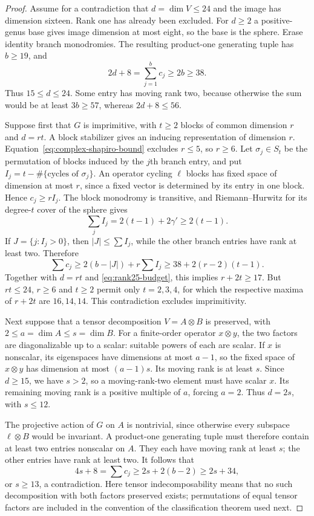 \begin{proof}
Assume for a contradiction that $d=\dim V\le24$ and the image has dimension sixteen. Rank one has already been excluded. For $d\ge2$ a positive-genus base gives image dimension at most eight, so the base is the sphere. Erase identity branch monodromies. The resulting product-one generating tuple has $b\ge19$, and
\begin{equation}\label{eq:rank25-budget}
 2d+8=\sum_{j=1}^{b}c_j\ge2b\ge38.
\end{equation}
Thus $15\le d\le24$. Some entry has moving rank two, because otherwise the sum would be at least $3b\ge57$, whereas $2d+8\le56$.

Suppose first that $G$ is imprimitive, with $t\ge2$ blocks of common dimension $r$ and $d=rt$. A block stabilizer gives an inducing representation of dimension $r$. Equation~\eqref{eq:complex-shapiro-bound} excludes $r\le5$, so $r\ge6$. Let $\sigma_j\in S_t$ be the permutation of blocks induced by the $j$th branch entry, and put $I_j=t-\#\{\text{cycles of }\sigma_j\}$. An operator cycling $\ell$ blocks has fixed space of dimension at most $r$, since a fixed vector is determined by its entry in one block. Hence $c_j\ge rI_j$. The block monodromy is transitive, and Riemann--Hurwitz for its degree-$t$ cover of the sphere gives
\[
 \sum_j I_j=2(t-1)+2\gamma'\ge2(t-1).
\]
If $J=\{j:I_j>0\}$, then $|J|\le\sum I_j$, while the other branch entries have rank at least two. Therefore
\[
 \sum c_j\ge2(b-|J|)+r\sum I_j
       \ge38+2(r-2)(t-1).
\]
Together with $d=rt$ and \eqref{eq:rank25-budget}, this implies $r+2t\ge17$. But $rt\le24$, $r\ge6$ and $t\ge2$ permit only $t=2,3,4$, for which the respective maxima of $r+2t$ are $16,14,14$. This contradiction excludes imprimitivity.

Next suppose that a tensor decomposition $V=A\otimes B$ is preserved, with $2\le a=\dim A\le s=\dim B$. For a finite-order operator $x\otimes y$, the two factors are diagonalizable up to a scalar: suitable powers of each are scalar. If $x$ is nonscalar, its eigenspaces have dimensions at most $a-1$, so the fixed space of $x\otimes y$ has dimension at most $(a-1)s$. Its moving rank is at least $s$. Since $d\ge15$, we have $s>2$, so a moving-rank-two element must have scalar $x$. Its remaining moving rank is a positive multiple of $a$, forcing $a=2$. Thus $d=2s$, with $s\le12$.

The projective action of $G$ on $A$ is nontrivial, since otherwise every subspace $\ell\otimes B$ would be invariant. A product-one generating tuple must therefore contain at least two entries nonscalar on $A$. They each have moving rank at least $s$; the other entries have rank at least two. It follows that
\[
 4s+8=\sum c_j\ge2s+2(b-2)\ge2s+34,
\]
or $s\ge13$, a contradiction. Here tensor indecomposability means that no such decomposition with both factors preserved exists; permutations of equal tensor factors are included in the convention of the classification theorem used next.


\end{proof}
